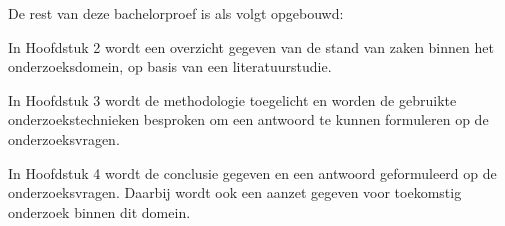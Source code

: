 De rest van deze bachelorproef is als volgt opgebouwd:

In Hoofdstuk 2 wordt een overzicht gegeven van de stand van zaken binnen het onderzoeksdomein, op basis van een literatuurstudie.

In Hoofdstuk 3 wordt de methodologie toegelicht en worden de gebruikte onderzoekstechnieken besproken om een antwoord te kunnen formuleren op de onderzoeksvragen.

In Hoofdstuk 4 wordt de conclusie gegeven en een antwoord geformuleerd op de onderzoeksvragen. Daarbij wordt ook een aanzet gegeven voor toekomstig onderzoek binnen dit domein.